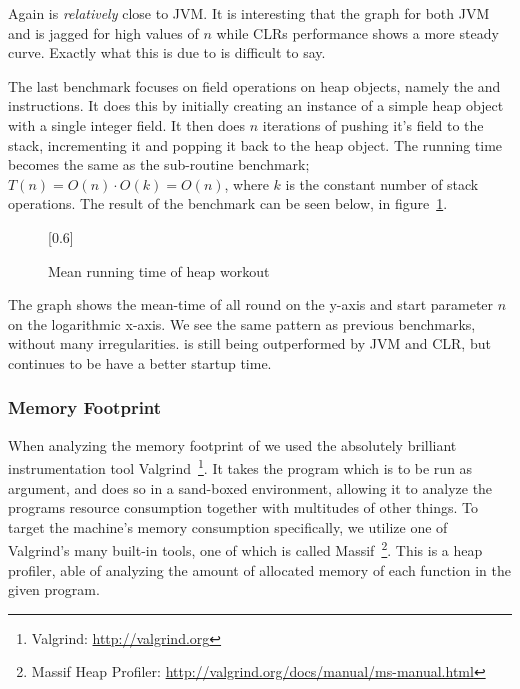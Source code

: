 Again \thename{} is \emph{relatively} close to JVM. It is interesting that the
graph for both JVM and \thename{} is jagged for high values of $n$ while CLRs
performance shows a more steady curve. Exactly what this is due to is difficult
to say.


The last benchmark focuses on field operations on heap objects, namely the
 and  instructions. It does
this by initially creating an instance of a simple heap object with a single
integer field. It then does $n$ iterations of pushing it's field to the stack,
incrementing it and popping it back to the heap object. The running time becomes
the same as the sub-routine benchmark; $T(n) = O(n) \cdot O(k) = O(n)$, where
$k$ is the constant number of stack operations. The result of the
benchmark can be seen below, in figure~\ref{fig:eval:benchmark:heap}.

\begin{figure}[H]
  \centering
  \scalebox{0.8}[0.6]{}
  \caption{Mean running time of heap workout}
\label{fig:eval:benchmark:heap}
\end{figure}

The graph shows the mean-time of all round on the y-axis and start parameter $n$
on the logarithmic x-axis. We see the same pattern as previous benchmarks,
without many irregularities. \thename{} is still being outperformed by JVM and
CLR, but continues to be have a better startup time.


\subsubsection{Memory Footprint}


When analyzing the memory footprint of \thename{} we used the absolutely
brilliant instrumentation tool Valgrind~\footnote{Valgrind:
  \url{http://valgrind.org}}. It takes the program which is to be run as
argument, and does so in a sand-boxed environment, allowing it to analyze the
programs resource consumption together with multitudes of other things. To
target the machine's memory consumption specifically, we utilize one of
Valgrind's many built-in tools, one of which is called Massif~\footnote{Massif
  Heap Profiler: \url{http://valgrind.org/docs/manual/ms-manual.html}}. This is
a heap profiler, able of analyzing the amount of allocated memory of each
function in the given program.

